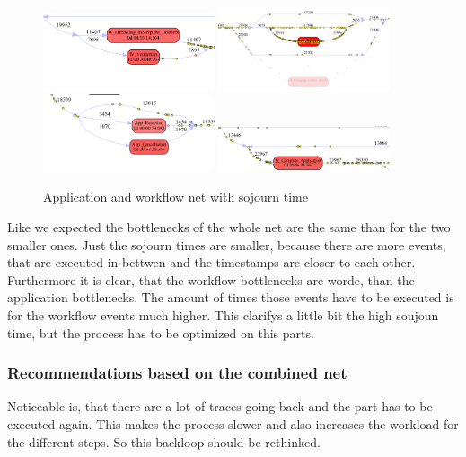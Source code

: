\begin{figure}[!htbp]
\centering
\includegraphics[width = 0.45\textwidth]{APP_Work_BottleVal.PNG}
\includegraphics[width = 0.45\textwidth]{APP_Work_BottleQuot.PNG}
\includegraphics[width = 0.45\textwidth]{APP_Work_BottleCanc.PNG}
\includegraphics[width = 0.45\textwidth]{APP_Work_BottleCompl.PNG}
\caption{Application and workflow net with sojourn time}
\label{fig: AppWorkSojuComp}
\end{figure}

Like we expected the bottlenecks of the whole net are the same than for the two smaller ones. Just the sojourn times are smaller, because there are more events, that are executed in bettwen and the timestamps are closer to each other. Furthermore it is clear, that the workflow bottlenecks are worde, than the application bottlenecks. The amount of times those events have to be executed is for the workflow events much higher. This clarifys a little bit the high soujoun time, but the process has to be optimized on this parts.

\subsubsection{Recommendations based on the combined net}

Noticeable is, that there are a lot of traces going back and the part has to be executed again. This makes the process slower and also increases the workload for the different steps. So this backloop should be rethinked. 